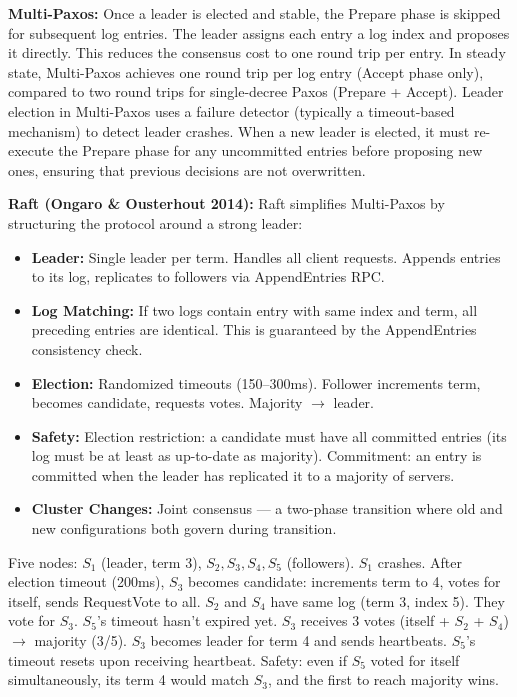 \textbf{Multi-Paxos:} Once a leader is elected and stable, the Prepare phase is skipped for subsequent log entries. The leader assigns each entry a log index and proposes it directly. This reduces the consensus cost to one round trip per entry. In steady state, Multi-Paxos achieves one round trip per log entry (Accept phase only), compared to two round trips for single-decree Paxos (Prepare + Accept). Leader election in Multi-Paxos uses a failure detector (typically a timeout-based mechanism) to detect leader crashes. When a new leader is elected, it must re-execute the Prepare phase for any uncommitted entries before proposing new ones, ensuring that previous decisions are not overwritten.

\textbf{Raft (Ongaro \& Ousterhout 2014):} Raft simplifies Multi-Paxos by structuring the protocol around a strong leader:

\begin{itemize}
\item \textbf{Leader:} Single leader per term. Handles all client requests. Appends entries to its log, replicates to followers via AppendEntries RPC.
\item \textbf{Log Matching:} If two logs contain entry with same index and term, all preceding entries are identical. This is guaranteed by the AppendEntries consistency check.
\item \textbf{Election:} Randomized timeouts (150--300ms). Follower increments term, becomes candidate, requests votes. Majority $\to$ leader.
\item \textbf{Safety:} Election restriction: a candidate must have all committed entries (its log must be at least as up-to-date as majority). Commitment: an entry is committed when the leader has replicated it to a majority of servers.
\item \textbf{Cluster Changes:} Joint consensus — a two-phase transition where old and new configurations both govern during transition.
\end{itemize}

\begin{example}
Five nodes: $S_1$ (leader, term 3), $S_2, S_3, S_4, S_5$ (followers). $S_1$ crashes. After election timeout (200ms), $S_3$ becomes candidate: increments term to 4, votes for itself, sends RequestVote to all. $S_2$ and $S_4$ have same log (term 3, index 5). They vote for $S_3$. $S_5$'s timeout hasn't expired yet. $S_3$ receives 3 votes (itself + $S_2$ + $S_4$) $\to$ majority (3/5). $S_3$ becomes leader for term 4 and sends heartbeats. $S_5$'s timeout resets upon receiving heartbeat. Safety: even if $S_5$ voted for itself simultaneously, its term 4 would match $S_3$, and the first to reach majority wins.
\end{example}

